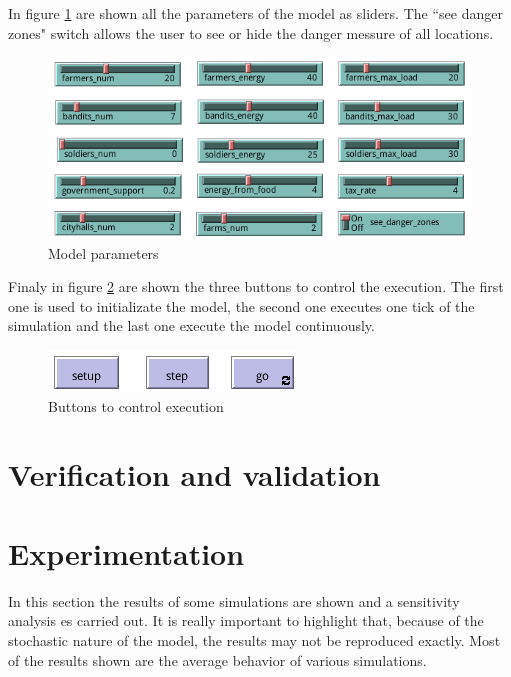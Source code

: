 \documentclass{wscpaperproc}
\begin{document}
In figure \ref{imp:parameters1} are shown all the parameters of the model as
sliders. The ``see danger zones" switch allows the user to see or hide the
danger messure of all locations.

\begin{figure}[h!]
    \centering
    \includegraphics[scale=0.5]{Images/Sliders1}
    \caption{Model parameters}
    \label{imp:parameters1}
\end{figure}

Finaly in figure \ref{imp:buttons} are shown the three buttons to control the
execution. The first one is used to initializate the model, the second one
executes one tick of the simulation and the last one execute the model
continuously.

\begin{figure}[h!]
    \centering
    \includegraphics[scale=0.5]{Images/Buttons}
    \caption{Buttons to control execution}
    \label{imp:buttons}
\end{figure}

\section{Verification and validation}

\section{Experimentation}

In this section the results of some simulations are shown and a sensitivity
analysis es carried out. It is really important to highlight that, because
of the stochastic nature of the model, the results may not be reproduced
exactly. Most of the results shown are the average behavior of various
simulations.
\end{document}
